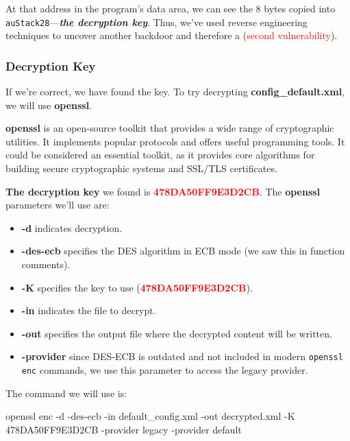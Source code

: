 \documentclass[12pt,a4paper, brazil]{article}
\begin{document}
At that address in the program’s data area, we can see the 8 bytes copied into \texttt{auStack28}—\emph{\textbf{the decryption key}}. Thus, we’ve used reverse engineering techniques to uncover another backdoor and therefore a (\textcolor{red}{second vulnerability}).

\subsubsection{Decryption Key}

If we’re correct, we have found the key. To try decrypting \textbf{config\_default.xml}, we will use \textbf{openssl}.

\begin{tcolorbox}[colback=green!10]
    \textbf{openssl} is an open-source toolkit that provides a wide range of cryptographic utilities. It implements popular protocols and offers useful programming tools. It could be considered an essential toolkit, as it provides core algorithms for building secure cryptographic systems and SSL/TLS certificates.

    \textbf{The decryption key} we found is \textbf{\textcolor{red}{478DA50FF9E3D2CB}}. The \textbf{openssl} parameters we’ll use are:

    \begin{itemize}
        \item \textbf{-d} indicates decryption.
        \item \textbf{-des-ecb} specifies the DES algorithm in ECB mode (we saw this in function comments).
        \item \textbf{-K} specifies the key to use (\textbf{\textcolor{red}{478DA50FF9E3D2CB}}).
        \item \textbf{-in} indicates the file to decrypt.
        \item \textbf{-out} specifies the output file where the decrypted content will be written.
        \item \textbf{-provider} since DES-ECB is outdated and not included in modern \texttt{openssl enc} commands, we use this parameter to access the legacy provider.
    \end{itemize}
\end{tcolorbox}

The command we will use is:

\begin{tcolorbox}[colback=red!10]
openssl enc -d -des-ecb -in default\_config.xml -out decrypted.xml -K 478DA50FF9E3D2CB -provider legacy -provider default
\end{tcolorbox}
\end{document}
